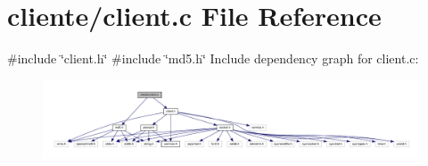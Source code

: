 \section{cliente/client.c File Reference}
\label{client_8c}
{\ttfamily \#include \char`\"{}client.\+h\char`\"{}}\newline
{\ttfamily \#include \char`\"{}md5.\+h\char`\"{}}\newline
Include dependency graph for client.\+c\+:\nopagebreak
\begin{figure}[H]
\begin{center}
\leavevmode
\includegraphics[width=350pt]{client_8c__incl}
\end{center}
\end{figure}
